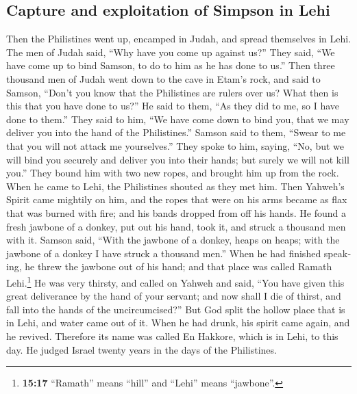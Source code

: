 \begin{paracol}{2}
\begin{otherlanguage}{english}
\hypertarget{capture-and-exploitation-of-simpson-in-lehi}{%
\subsection{Capture and exploitation of Simpson in
Lehi}\label{capture-and-exploitation-of-simpson-in-lehi}}

 Then the Philistines went up, encamped in Judah, and
spread themselves in Lehi.  The men of Judah said, ``Why
have you come up against us?'' They said, ``We have come up to bind
Samson, to do to him as he has done to us.''  Then three
thousand men of Judah went down to the cave in Etam's rock, and said to
Samson, ``Don't you know that the Philistines are rulers over us? What
then is this that you have done to us?'' He said to them, ``As they did
to me, so I have done to them.''  They said to him, ``We
have come down to bind you, that we may deliver you into the hand of the
Philistines.'' Samson said to them, ``Swear to me that you will not
attack me yourselves.''  They spoke to him, saying, ``No,
but we will bind you securely and deliver you into their hands; but
surely we will not kill you.'' They bound him with two new ropes, and
brought him up from the rock.  When he came to Lehi, the
Philistines shouted as they met him. Then Yahweh's Spirit came mightily
on him, and the ropes that were on his arms became as flax that was
burned with fire; and his bands dropped from off his hands.
 He found a fresh jawbone of a donkey, put out his hand,
took it, and struck a thousand men with it.  Samson said,
``With the jawbone of a donkey, heaps on heaps; with the jawbone of a
donkey I have struck a thousand men.''  When he had
finished speaking, he threw the jawbone out of his hand; and that place
was called Ramath Lehi.\footnote{\textbf{15:17} ``Ramath'' means
  ``hill'' and ``Lehi'' means ``jawbone''.}  He was very
thirsty, and called on Yahweh and said, ``You have given this great
deliverance by the hand of your servant; and now shall I die of thirst,
and fall into the hands of the uncircumcised?''  But God
split the hollow place that is in Lehi, and water came out of it. When
he had drunk, his spirit came again, and he revived. Therefore its name
was called En Hakkore, which is in Lehi, to this day.  He
judged Israel twenty years in the days of the Philistines.

\end{otherlanguage}


\end{paracol}
